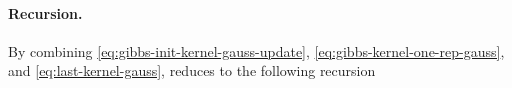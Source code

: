 \paragraph{Recursion.}
By combining \eqref{eq:gibbs-init-kernel-gauss-update}, \eqref{eq:gibbs-kernel-one-rep-gauss}, and \eqref{eq:last-kernel-gauss},  reduces to the following recursion
